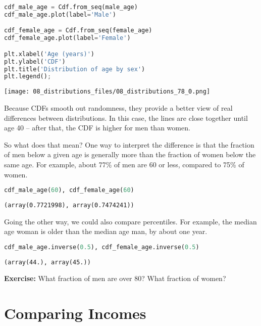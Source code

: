 \begin{lstlisting}[language=Python,style=source]
cdf_male_age = Cdf.from_seq(male_age)
cdf_male_age.plot(label='Male')

cdf_female_age = Cdf.from_seq(female_age)
cdf_female_age.plot(label='Female')

plt.xlabel('Age (years)')
plt.ylabel('CDF')
plt.title('Distribution of age by sex')
plt.legend();
\end{lstlisting}

\begin{center}
\texttt{[image: 08\_distributions\_files/08\_distributions\_78\_0.png]}
\end{center}

Because CDFs smooth out randomness, they provide a better view of real
differences between distributions. In this case, the lines are close
together until age 40 -- after that, the CDF is higher for men than
women.

So what does that mean? One way to interpret the difference is that the
fraction of men below a given age is generally more than the fraction of
women below the same age. For example, about 77\% of men are 60 or less,
compared to 75\% of women.

\begin{lstlisting}[language=Python,style=source]
cdf_male_age(60), cdf_female_age(60)
\end{lstlisting}

\begin{lstlisting}[style=output]
(array(0.7721998), array(0.7474241))
\end{lstlisting}

\pagebreak

Going the other way, we could also compare percentiles. For example, the
median age woman is older than the median age man, by about one year.

\begin{lstlisting}[language=Python,style=source]
cdf_male_age.inverse(0.5), cdf_female_age.inverse(0.5)
\end{lstlisting}

\begin{lstlisting}[style=output]
(array(44.), array(45.))
\end{lstlisting}

\textbf{Exercise:} What fraction of men are over 80? What fraction of
women?

\section{Comparing Incomes}\label{comparing-incomes}

